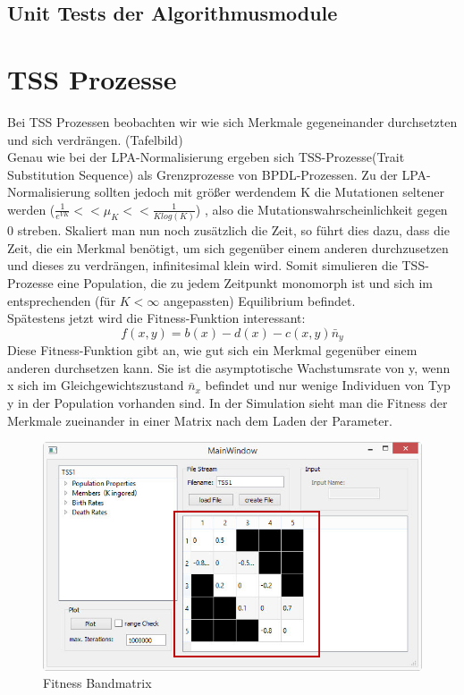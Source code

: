 \documentclass[11pt, a4paper, german]{article}
\begin{document}
	\subsection{Unit Tests der Algorithmusmodule}

\clearpage
\section{TSS Prozesse}
Bei TSS Prozessen beobachten wir wie sich Merkmale gegeneinander durchsetzten und sich verdrängen. (Tafelbild)\\
Genau wie bei der LPA-Normalisierung ergeben sich TSS-Prozesse(Trait Substitution Sequence) als Grenzprozesse von BPDL-Prozessen. Zu der LPA-Normalisierung sollten jedoch mit größer werdendem K die Mutationen seltener werden ($ \frac{1}{e^{VK}} << \mu_K << \frac{1}{K log(K)} $) , also die Mutationswahrscheinlichkeit gegen 0 streben. Skaliert man nun noch zusätzlich die Zeit, so führt dies dazu, dass die Zeit, die ein Merkmal benötigt, um sich gegenüber einem anderen durchzusetzen und dieses zu verdrängen, infinitesimal klein wird. Somit simulieren die TSS-Prozesse eine Population, die zu jedem Zeitpunkt monomorph ist und sich im entsprechenden (für $ K < \infty $ angepassten) Equilibrium befindet.\\
Spätestens jetzt wird die Fitness-Funktion interessant:
\[ f(x,y) = b(x) - d(x) - c(x,y)\bar{n}_y \]
Diese Fitness-Funktion gibt an, wie gut sich ein Merkmal gegenüber einem anderen durchsetzen kann. Sie ist die asymptotische Wachstumsrate von y, wenn x sich im Gleichgewichtszustand $ \bar{n}_x $ befindet und nur wenige Individuen von Typ y in der Population vorhanden sind. In der Simulation sieht man die Fitness der Merkmale zueinander in einer Matrix nach dem Laden der Parameter.
\begin{figure}[H]
	\centering
	\includegraphics[width=0.7\linewidth]{./Pictures/MainWindow_BandMatrix}
	\caption[Fitness Matrix]{Fitness Bandmatrix}
	\label{MainWindow mit Fitness Bandmatrix}
\end{figure}
\end{document}
